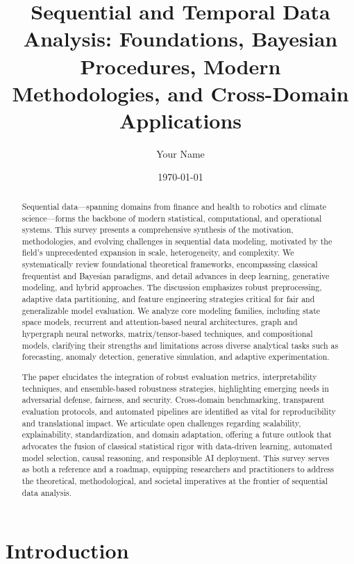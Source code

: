 \documentclass[11pt]{article}
\begin{document}
\author{Your Name}
\date{\today}

\title{\title{Sequential and Temporal Data Analysis: Foundations, Bayesian Procedures, Modern Methodologies, and Cross-Domain Applications}}
\maketitle

\begin{abstract}
Sequential data—spanning domains from finance and health to robotics and climate science—forms the backbone of modern statistical, computational, and operational systems. This survey presents a comprehensive synthesis of the motivation, methodologies, and evolving challenges in sequential data modeling, motivated by the field’s unprecedented expansion in scale, heterogeneity, and complexity. We systematically review foundational theoretical frameworks, encompassing classical frequentist and Bayesian paradigms, and detail advances in deep learning, generative modeling, and hybrid approaches. The discussion emphasizes robust preprocessing, adaptive data partitioning, and feature engineering strategies critical for fair and generalizable model evaluation. We analyze core modeling families, including state space models, recurrent and attention-based neural architectures, graph and hypergraph neural networks, matrix/tensor-based techniques, and compositional models, clarifying their strengths and limitations across diverse analytical tasks such as forecasting, anomaly detection, generative simulation, and adaptive experimentation.

The paper elucidates the integration of robust evaluation metrics, interpretability techniques, and ensemble-based robustness strategies, highlighting emerging needs in adversarial defense, fairness, and security. Cross-domain benchmarking, transparent evaluation protocols, and automated pipelines are identified as vital for reproducibility and translational impact. We articulate open challenges regarding scalability, explainability, standardization, and domain adaptation, offering a future outlook that advocates the fusion of classical statistical rigor with data-driven learning, automated model selection, causal reasoning, and responsible AI deployment. This survey serves as both a reference and a roadmap, equipping researchers and practitioners to address the theoretical, methodological, and societal imperatives at the frontier of sequential data analysis.
\end{abstract}\section{Introduction}
\end{document}

